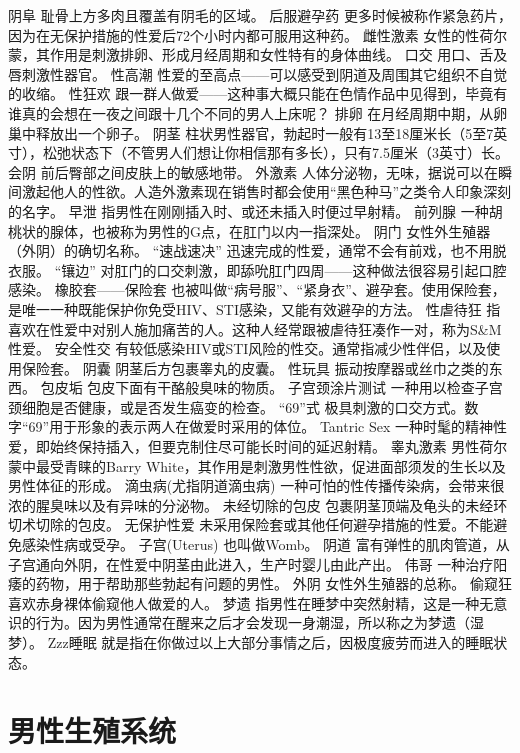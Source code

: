 \documentclass[12pt,UTF8,openany]{ctexbook}
\begin{document}
阴阜
耻骨上方多肉且覆盖有阴毛的区域。
后服避孕药
更多时候被称作紧急药片，因为在无保护措施的性爱后72个小时内都可服用这种药。
雌性激素
女性的性荷尔蒙，其作用是刺激排卵、形成月经周期和女性特有的身体曲线。
口交
用口、舌及唇刺激性器官。
性高潮
性爱的至高点——可以感受到阴道及周围其它组织不自觉的收缩。
性狂欢
跟一群人做爱——这种事大概只能在色情作品中见得到，毕竟有谁真的会想在一夜之间跟十几个不同的男人上床呢？
排卵
在月经周期中期，从卵巢中释放出一个卵子。
阴茎
柱状男性器官，勃起时一般有13至18厘米长（5至7英寸），松弛状态下（不管男人们想让你相信那有多长），只有7.5厘米（3英寸）长。
会阴
前后臀部之间皮肤上的敏感地带。
外激素
人体分泌物，无味，据说可以在瞬间激起他人的性欲。人造外激素现在销售时都会使用“黑色种马”之类令人印象深刻的名字。
早泄
指男性在刚刚插入时、或还未插入时便过早射精。
前列腺
一种胡桃状的腺体，也被称为男性的G点，在肛门以内一指深处。
阴门
女性外生殖器（外阴）的确切名称。
“速战速决”
迅速完成的性爱，通常不会有前戏，也不用脱衣服。
“镶边”
对肛门的口交刺激，即舔吮肛门四周——这种做法很容易引起口腔感染。
橡胶套——保险套
也被叫做“病号服”、“紧身衣”、避孕套。使用保险套，是唯一一种既能保护你免受HIV、STI感染，又能有效避孕的方法。
性虐待狂
指喜欢在性爱中对别人施加痛苦的人。这种人经常跟被虐待狂凑作一对，称为S\&M性爱。
安全性交
有较低感染HIV或STI风险的性交。通常指减少性伴侣，以及使用保险套。
阴囊
阴茎后方包裹睾丸的皮囊。
性玩具
振动按摩器或丝巾之类的东西。
包皮垢
包皮下面有干酪般臭味的物质。
子宫颈涂片测试
一种用以检查子宫颈细胞是否健康，或是否发生癌变的检查。
“69”式
极具刺激的口交方式。数字“69”用于形象的表示两人在做爱时采用的体位。
Tantric Sex
一种时髦的精神性爱，即始终保持插入，但要克制住尽可能长时间的延迟射精。
睾丸激素
男性荷尔蒙中最受青睐的Barry White，其作用是刺激男性性欲，促进面部须发的生长以及男性体征的形成。
滴虫病(尤指阴道滴虫病)
一种可怕的性传播传染病，会带来很浓的腥臭味以及有异味的分泌物。
未经切除的包皮
包裹阴茎顶端及龟头的未经环切术切除的包皮。
无保护性爱
未采用保险套或其他任何避孕措施的性爱。不能避免感染性病或受孕。
子宫(Uterus)
也叫做Womb。
阴道
富有弹性的肌肉管道，从子宫通向外阴，在性爱中阴茎由此进入，生产时婴儿由此产出。
伟哥
一种治疗阳痿的药物，用于帮助那些勃起有问题的男性。
外阴
女性外生殖器的总称。
偷窥狂
喜欢赤身裸体偷窥他人做爱的人。
梦遗
指男性在睡梦中突然射精，这是一种无意识的行为。因为男性通常在醒来之后才会发现一身潮湿，所以称之为梦遗（湿梦）。
Zzz睡眠
就是指在你做过以上大部分事情之后，因极度疲劳而进入的睡眠状态。





\chapter{男性生殖系统}
\end{document}

